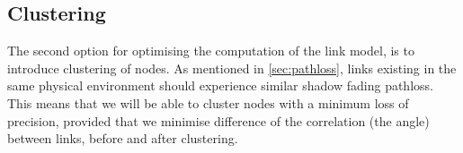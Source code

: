 \subsection{Clustering}\label{sec:clustering}
The second option for optimising the computation of the link model, is to introduce clustering of nodes. As mentioned in \autoref{sec:pathloss}, links existing in the same physical environment should experience similar shadow fading \gls{pathloss}. This means that we will be able to cluster nodes with a minimum loss of precision, provided that we minimise difference of the correlation (the angle) between links, before and after clustering.





